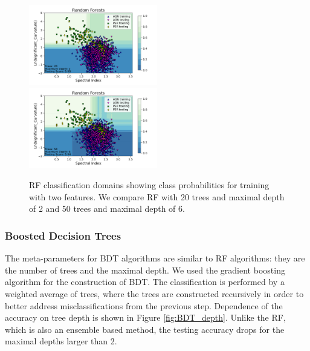 \begin{figure}[h]
\includegraphics[width=0.5\textwidth]{plots/classification_domains/rf_20_2_final.pdf}
\includegraphics[width=0.5\textwidth]{plots/classification_domains/rf_50_6_final.pdf}
\caption{RF classification domains showing class probabilities for training with two features. 
We compare RF with 20 trees and maximal depth of 2 and 50 trees and maximal depth of 6.
}  
\label{fig:RF_domains}
\end{figure}



\subsubsection{Boosted Decision Trees}

The meta-parameters for BDT algorithms are similar to RF algorithms: they are the number of trees and the maximal depth.
We used the gradient boosting algorithm for the construction of BDT.
The classification is performed by a weighted average of trees, where the trees are constructed recursively in order to better address 
misclassifications from the previous step. 
Dependence of the accuracy on tree depth is shown in Figure \ref{fig:BDT_depth}. 
Unlike the RF, which is also an ensemble based method, the testing accuracy drops for the maximal depths larger than 2. 

